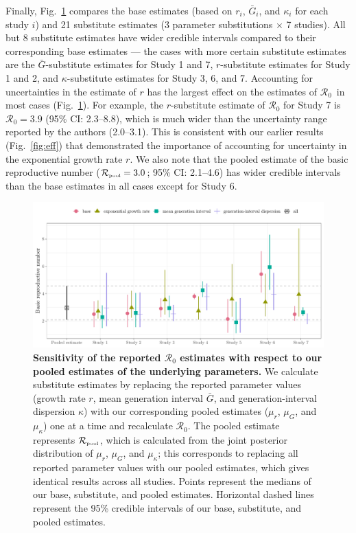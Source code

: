 \documentclass[12pt]{article}
\newcommand{\fref}[1]{Fig.~\ref{fig:#1}}
\newcommand{\Ro}{\ensuremath{{\mathcal R}_{0}}\xspace}
\newcommand{\Rpool}{\ensuremath{{\mathcal R}_{\textrm{\tiny{pool}}}}\xspace}
\begin{document}
Finally, \fref{R0} compares the base estimates (based on $r_i$, $\bar G_i$, and $\kappa_i$ for each study $i$) and 21 substitute estimates (3 parameter substitutions $\times$ 7 studies).
All but 8 substitute estimates have wider credible intervals compared to their corresponding base estimates --- the cases with more certain substitute estimates are the $\bar G$-substitute estimates for Study 1 and 7, $r$-substitute estimates for Study 1 and 2, and  $\kappa$-substitute estimates for Study 3, 6, and 7.
Accounting for uncertainties in the estimate of $r$ has the largest effect on the estimates of \Ro\ in most cases (\fref{R0}).
For example, the $r$-substitute estimate of \Ro for Study 7 is $\Ro = 3.9$ (95\% CI: 2.3--8.8), which is much wider than the uncertainty range reported by the authors (2.0--3.1).
This is consistent with our earlier results (\fref{eff}) that demonstrated the importance of accounting for uncertainty in the exponential growth rate $r$.
We also note that the pooled estimate of the basic reproductive number ($\Rpool = 3.0$; 95\% CI: 2.1--4.6) has wider credible intervals than the base estimates in all cases except for Study 6.

\begin{figure}[!th]
\includegraphics[width=\textwidth]{compare_R0.pdf}
\caption{
\textbf{Sensitivity of the reported \Ro estimates with respect to our pooled estimates of the underlying parameters.}
We calculate substitute estimates by replacing the reported parameter values (growth rate $r$, mean generation interval $\bar G$, and generation-interval dispersion $\kappa$) with our corresponding pooled estimates ($\mu_r$, $\mu_G$, and $\mu_\kappa$) one at a time and recalculate \Ro.
The pooled estimate represents \Rpool, which is calculated from the joint posterior distribution of $\mu_r$, $\mu_G$, and $\mu_\kappa$;
this corresponds to replacing all reported parameter values with our pooled estimates, which gives identical results across all studies.
Points represent the medians of our base, substitute, and pooled estimates.
Horizontal dashed lines represent the 95\% credible intervals of our base, substitute, and pooled estimates.
}
\label{fig:R0}
\end{figure}
\end{document}
